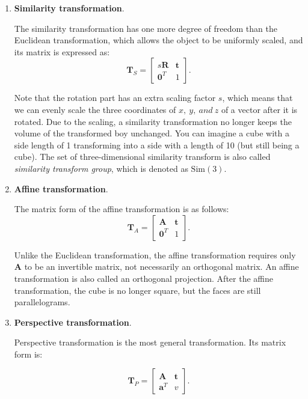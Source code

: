 \begin{enumerate}
	\item {\textbf{Similarity transformation}}.
	
	The similarity transformation has one more degree of freedom than the Euclidean transformation, which allows the object to be uniformly scaled, and its matrix is expressed as:
	\begin{equation}
	\mathbf{T}_S = \left[ {\begin{array}{*{20}{c}}
		{s \mathbf{R}}& \mathbf{t}\\
		{{ \mathbf{0}^T}}&1
		\end{array}} \right].
	\end{equation}
	
	Note that the rotation part has an extra scaling factor $s$, which means that we can evenly scale the three coordinates of $x,\ y,\ and\ z$ of a vector after it is rotated. Due to the scaling, a similarity transformation no longer keeps the volume of the transformed boy unchanged. You can imagine a cube with a side length of 1 transforming into a side with a length of 10 (but still being a cube). The set of three-dimensional similarity transform is also called \textit{similarity transform group}, which is denoted as $\mathrm{Sim}(3)$.
	
	\item {\textbf{Affine transformation}}.
	
	The matrix form of the affine transformation is as follows:
	\begin{equation}
	\mathbf{T}_A = \left[ {\begin{array}{*{20}{c}}
		\mathbf{A} & \mathbf{t}\\
		{{\mathbf{0}^T}} & 1
		\end{array}} \right].
	\end{equation}
	

	Unlike the Euclidean transformation, the affine transformation requires only $\mathbf{A}$ to be an invertible matrix, not necessarily an orthogonal matrix. An affine transformation is also called an orthogonal projection. After the affine transformation, the cube is no longer square, but the faces are still parallelograms.	
	
	\item{ \textbf{Perspective transformation}. }
	
	Perspective transformation is the most general transformation. Its matrix form is:
	
	\begin{equation}
	{\mathbf{T}_P} = \left[ {\begin{array}{*{20}{c}}
		\mathbf{A} & \mathbf{t}\\
		{{\mathbf{a}^T}} & v
		\end{array}} \right].
	\end{equation}
	

\end{enumerate}
